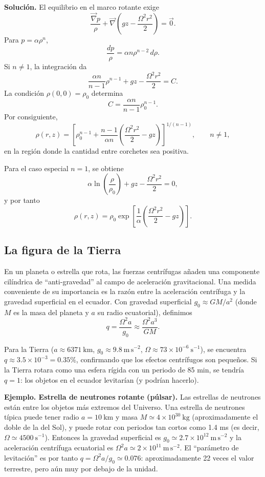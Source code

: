 \textbf{Solución.} El equilibrio en el marco rotante exige
$$ \frac{\vec{\nabla}p}{\rho}
+\vec{\nabla}\left(gz-\frac{\Omega^2r^2}{2}\right)=\vec{0}. $$
Para $p=\alpha\rho^n$,
$$ \frac{dp}{\rho}=\alpha n\rho^{n-2}\,d\rho. $$
Si $n\neq1$, la integración da
$$ \frac{\alpha n}{n-1}\rho^{n-1}
+gz-\frac{\Omega^2r^2}{2}=C. $$
La condición $\rho(0,0)=\rho_0$ determina
$$ C=\frac{\alpha n}{n-1}\rho_0^{n-1}. $$
Por consiguiente,
$$ \boxed{
\rho(r,z)=
\left[
\rho_0^{n-1}
+\frac{n-1}{\alpha n}
\left(\frac{\Omega^2r^2}{2}-gz\right)
\right]^{1/(n-1)}
}, \qquad n\neq1, $$
en la región donde la cantidad entre corchetes sea positiva.

Para el caso especial $n=1$, se obtiene
$$ \alpha\ln\left(\frac{\rho}{\rho_0}\right)
+gz-\frac{\Omega^2r^2}{2}=0, $$
y por tanto
$$ \boxed{
\rho(r,z)=\rho_0
\exp\left[
\frac{1}{\alpha}
\left(\frac{\Omega^2r^2}{2}-gz\right)
\right]
}. $$

\subsection{La figura de la Tierra}

En un planeta o estrella que rota, las fuerzas centrífugas añaden una componente cilíndrica de ``anti-gravedad'' al campo de aceleración gravitacional. Una medida conveniente de su importancia es la razón entre la aceleración centrífuga y la gravedad superficial en el ecuador. Con gravedad superficial $g_0 \approx GM/a^2$ (donde $M$ es la masa del planeta y $a$ su radio ecuatorial), definimos
$$ q = \frac{\Omega^2 a}{g_0} \approx \frac{\Omega^2 a^3}{GM}. $$

Para la Tierra ($a \approx 6371\ \mathrm{km}$, $g_0 \approx 9.8\ \mathrm{m\,s^{-2}}$, $\Omega \approx 73\times 10^{-6}\ \mathrm{s^{-1}}$), se encuentra $q \approx 3.5\times 10^{-3} = 0.35\%$, confirmando que los efectos centrífugos son pequeños. Si la Tierra rotara como una esfera rígida con un periodo de 85 min, se tendría $q = 1$: los objetos en el ecuador levitarían (y podrían hacerlo).

\textbf{Ejemplo. Estrella de neutrones rotante (púlsar).} Las estrellas de neutrones están entre los objetos más extremos del Universo. Una estrella de neutrones típica puede tener radio $a = 10\ \mathrm{km}$ y masa $M \simeq 4\times 10^{30}\ \mathrm{kg}$ (aproximadamente el doble de la del Sol), y puede rotar con periodos tan cortos como 1.4 ms (es decir, $\Omega \simeq 4500\ \mathrm{s^{-1}}$). Entonces la gravedad superficial es $g_0 \simeq 2.7\times 10^{12}\ \mathrm{m\,s^{-2}}$ y la aceleración centrífuga ecuatorial es $\Omega^2 a \simeq 2\times 10^{11}\ \mathrm{m\,s^{-2}}$. El ``parámetro de levitación'' es por tanto $q = \Omega^2 a/g_0 \simeq 0.076$: aproximadamente 22 veces el valor terrestre, pero aún muy por debajo de la unidad.

